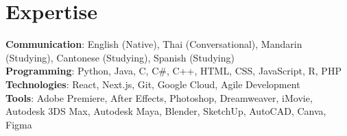 \documentclass[letterpaper,11pt]{article}
\begin{document}
\section{Expertise}
 \begin{itemize}[leftmargin=0.1in, label={}]
    \small{\item{
     \textbf{Communication}{: English (Native), Thai (Conversational), Mandarin (Studying), Cantonese (Studying), Spanish (Studying)} \\
     \textbf{Programming}{: Python, Java, C, C\#, C++, HTML, CSS, JavaScript, R, PHP} \\
     \textbf{Technologies}{: React, Next.js, Git, Google Cloud, Agile Development}\\
     \textbf{Tools}{: Adobe Premiere, After Effects, Photoshop, Dreamweaver, iMovie, Autodesk 3DS Max, Autodesk Maya, Blender, SketchUp, AutoCAD, Canva, Figma}\\
     
    }}
 \end{itemize}
 \vspace{-20pt}
\end{document}
